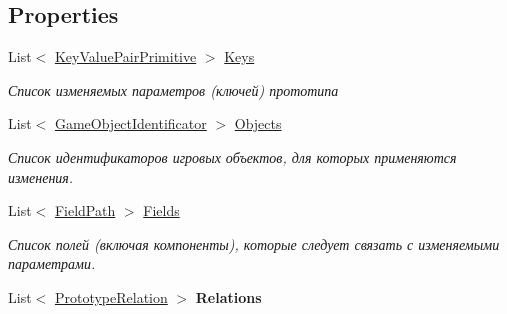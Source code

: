 \subsection*{Properties}
\begin{DoxyCompactItemize}
\item 
List$<$ \hyperlink{struct_hattori_game2_1_1_core_1_1_key_value_pair_primitive}{Key\+Value\+Pair\+Primitive} $>$ \hyperlink{class_hattori_game2_1_1_prototyping_1_1_prototype_data_adeb9b7b2375419356a996c8650d76c1c_adeb9b7b2375419356a996c8650d76c1c}{Keys}
\begin{DoxyCompactList}\small\item\em Список изменяемых параметров (ключей) прототипа \end{DoxyCompactList}\item 
List$<$ \hyperlink{struct_hattori_game2_1_1_core_1_1_game_object_identificator}{Game\+Object\+Identificator} $>$ \hyperlink{class_hattori_game2_1_1_prototyping_1_1_prototype_data_ad41d44ad2fdeaca9288581c3642f6efa_ad41d44ad2fdeaca9288581c3642f6efa}{Objects}
\begin{DoxyCompactList}\small\item\em Список идентификаторов игровых объектов, для которых применяются изменения. \end{DoxyCompactList}\item 
List$<$ \hyperlink{struct_hattori_game2_1_1_core_1_1_field_path}{Field\+Path} $>$ \hyperlink{class_hattori_game2_1_1_prototyping_1_1_prototype_data_af0ff4fa301c4c5f71805396bafab60f7_af0ff4fa301c4c5f71805396bafab60f7}{Fields}
\begin{DoxyCompactList}\small\item\em Список полей (включая компоненты), которые следует связать с изменяемыми параметрами. \end{DoxyCompactList}\item 
\hypertarget{class_hattori_game2_1_1_prototyping_1_1_prototype_data_a5fde6292351d472371b8b1aac353de0f}{}List$<$ \hyperlink{struct_hattori_game2_1_1_prototyping_1_1_prototype_relation}{Prototype\+Relation} $>$ {\bfseries Relations}\label{class_hattori_game2_1_1_prototyping_1_1_prototype_data_a5fde6292351d472371b8b1aac353de0f}

\end{DoxyCompactItemize}


